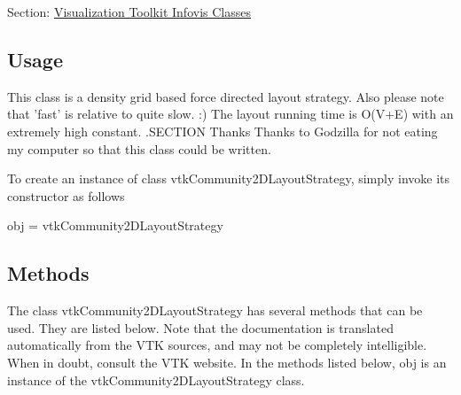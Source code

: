 Section\-: \hyperlink{sec_vtkinfovis}{Visualization Toolkit Infovis Classes} \hypertarget{vtkwidgets_vtkxyplotwidget_Usage}{}\subsection{Usage}\label{vtkwidgets_vtkxyplotwidget_Usage}
This class is a density grid based force directed layout strategy. Also please note that 'fast' is relative to quite slow. \-:) The layout running time is O(V+\-E) with an extremely high constant. .S\-E\-C\-T\-I\-O\-N Thanks Thanks to Godzilla for not eating my computer so that this class could be written.

To create an instance of class vtk\-Community2\-D\-Layout\-Strategy, simply invoke its constructor as follows \begin{DoxyVerb}  obj = vtkCommunity2DLayoutStrategy
\end{DoxyVerb}
 \hypertarget{vtkwidgets_vtkxyplotwidget_Methods}{}\subsection{Methods}\label{vtkwidgets_vtkxyplotwidget_Methods}
The class vtk\-Community2\-D\-Layout\-Strategy has several methods that can be used. They are listed below. Note that the documentation is translated automatically from the V\-T\-K sources, and may not be completely intelligible. When in doubt, consult the V\-T\-K website. In the methods listed below, {\ttfamily obj} is an instance of the vtk\-Community2\-D\-Layout\-Strategy class. 
